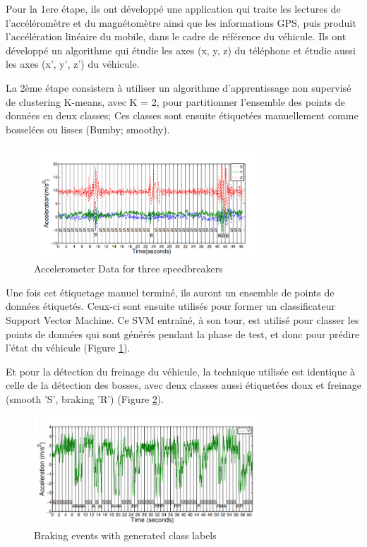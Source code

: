 Pour la 1ere étape, ils ont développé une application qui traite les lectures de l'accéléromètre et du magnétomètre ainsi que les informations GPS, puis produit l'accélération linéaire du mobile, dans le cadre de référence du véhicule. Ils ont développé un algorithme qui étudie les axes (x, y, z) du téléphone et étudie aussi les axes (x', y', z') du véhicule.

La 2ème étape consistera à utiliser un algorithme d'apprentissage non supervisé de clustering K-means, avec K = 2, pour partitionner l'ensemble des points de données en deux classes; Ces classes sont ensuite étiquetées manuellement comme bosselées ou lisses (Bumby; smoothy).

\begin{figure}[h!]
  \center
  \includegraphics[width=0.75\textwidth]{Images/chapter2/relatedWork1.PNG}
  \caption{Accelerometer Data for three speedbreakers}
  \label{fig:wolverine_1}
\end{figure}

Une fois cet étiquetage manuel terminé, ils auront  un ensemble de points de données étiquetés. Ceux-ci sont ensuite utilisés pour former un classificateur Support Vector Machine. Ce SVM entraîné, à son tour, est utilisé pour classer les points de données qui sont générés pendant la phase de test, et donc pour prédire l'état du véhicule (Figure \ref{fig:wolverine_1}).

Et pour la détection du freinage du véhicule, la technique utilisée est identique à celle de la détection des bosses, avec deux classes aussi étiquetées doux et freinage (smooth 'S', braking 'R') (Figure \ref{fig:wolverine_2}).

\begin{figure}[h!]
  \center
  \includegraphics[width=0.75\textwidth]{Images/chapter2/relatedWork2.PNG}
  \caption{Braking events with generated class labels}
  \label{fig:wolverine_2}
\end{figure}

